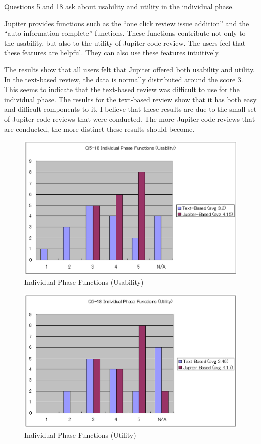 Questions 5 and 18 ask about usability and utility in the individual phase.

Jupiter provides functions such as the ``one click review issue addition'' and the ``auto information complete'' functions. These functions contribute not only to the usability, but also to the utility of Jupiter code review. The users feel that these features are helpful. They can also use these features intuitively.

The results show that all users felt that Jupiter offered both usability and utility. In the text-based review, the data is normally distributed around the score 3. This seems to indicate that the text-based review was difficult to use for the individual phase. The results for the text-based review show that it has both easy and difficult components to it. I believe that these results are due to the small set of Jupiter code reviews that were conducted. The more Jupiter code reviews that are conducted, the more distinct these results should become.

\begin{figure}[htbp]
  \centering
  \includegraphics{images/fig5-6.eps}
  \caption{Individual Phase Functions (Usability)}
  \label{fig5-6}
\end{figure}

\begin{figure}[htbp]
  \centering
  \includegraphics{images/fig5-7.eps}
  \caption{Individual Phase Functions (Utility)}
  \label{fig5-7}
\end{figure}

